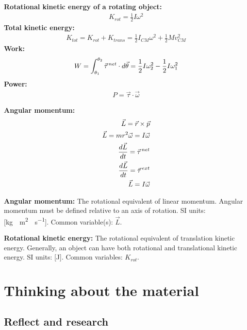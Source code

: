 \newpage
\begin{importantEquations}
\medskip
\begin{multicols}{2}
\textbf{Rotational kinetic energy of a rotating object:}
\begin{align*}
K_{rot} = \frac{1}{2}I\omega^2
\end{align*}
\textbf{Total kinetic energy:}
\begin{align*}
K_{tot} = K_{rot} + K_{trans} = \frac{1}{2}I_{CM}\omega^2+ \frac{1}{2}Mv_{CM}^2
\end{align*}
\textbf{Work:}
\begin{align*}
W = \int_{\theta_1}^{\theta_2}\pvec \tau^{net}\cdot d\vec \theta = \frac{1}{2}I\omega_2^2 -\frac{1}{2}I\omega_1^2
\end{align*}
\textbf{Power:}
\begin{align*}
P = \vec \tau \cdot \vec \omega
\end{align*}
\columnbreak

\textbf{Angular momentum:}
\begin{align*}
\vec L = \vec r \times \vec p\\
\vec L = mr^2\vec\omega = I\vec\omega\\
\frac{d\vec L}{dt}=\pvec\tau^{net}\\
\frac{d\vec L}{dt}=\pvec\tau^{ext}\\
\vec L = I\vec \omega\\
\end{align*}
\medskip
\end{multicols}
\end{importantEquations}

\begin{definitions}
\item \textbf{Angular momentum:} The rotational equivalent of linear momentum. Angular momentum must be defined relative to an axis of rotation. SI units: [\si{kg\cdot m^2\cdot s^{-1}}]. Common variable(s): $\vec L$.
\item \textbf{Rotational kinetic energy:} The rotational equivalent of translation kinetic energy. Generally, an object can have both rotational and translational kinetic energy.  SI units: [\si{J}]. Common variables: $K_{rot}$.	
\end{definitions}


\newpage
\section{Thinking about the material}
\subsection{Reflect and research}

